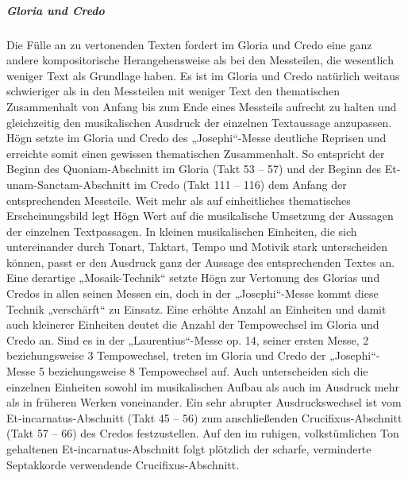 \documentclass[a4paper]{article}
\begin{document}
\subparagraph{Gloria und Credo}
Die Fülle an zu vertonenden Texten fordert im Gloria und Credo eine ganz
andere kompositorische Herangehensweise als bei den Messteilen, die
wesentlich weniger Text als Grundlage haben. Es ist im Gloria und Credo
natürlich weitaus schwieriger als in den Messteilen mit weniger Text
den thematischen Zusammenhalt von Anfang bis zum Ende eines Messteils
aufrecht zu halten und gleichzeitig den musikalischen Ausdruck der
einzelnen Textaussage anzupassen. Högn setzte im Gloria und Credo des
„Josephi“-Messe deutliche Reprisen und erreichte somit einen gewissen
thematischen Zusammenhalt. So entspricht der Beginn des
Quoniam-Abschnitt im Gloria (Takt 53 – 57) und der Beginn des
Et-unam-Sanctam-Abschnitt im Credo (Takt 111 – 116) dem Anfang der
entsprechenden Messteile. Weit mehr als auf einheitliches thematisches
Erscheinungsbild legt Högn Wert auf die musikalische Umsetzung der
Aussagen der einzelnen Textpassagen. In kleinen musikalischen
Einheiten, die sich untereinander durch Tonart, Taktart, Tempo und
Motivik stark unterscheiden können, passt er den Ausdruck ganz der
Aussage des entsprechenden Textes an. Eine derartige „Mosaik-Technik“
setzte Högn zur Vertonung des Glorias und Credos in allen seinen Messen
ein, doch in der „Josephi“-Messe kommt diese Technik „verschärft“ zu
Einsatz. Eine erhöhte Anzahl an Einheiten und damit auch kleinerer
Einheiten deutet die Anzahl der Tempowechsel im Gloria und Credo an.
Sind es in der „Laurentius“-Messe op. 14, seiner ersten Messe, 2
beziehungsweise 3 Tempowechsel, treten im Gloria und Credo der
„Josephi“-Messe 5 beziehungsweise 8 Tempowechsel auf. Auch
unterscheiden sich die einzelnen Einheiten sowohl im musikalischen
Aufbau als auch im Ausdruck mehr als in früheren Werken voneinander.
Ein sehr abrupter Ausdruckswechsel ist vom Et-incarnatus-Abschnitt
(Takt 45 – 56) zum anschließenden Crucifixus-Abschnitt (Takt 57 – 66)
des Credos festzustellen. Auf den im ruhigen, volkstümlichen Ton
gehaltenen Et-incarnatus-Abschnitt folgt plötzlich der scharfe,
verminderte Septakkorde verwendende Crucifixus-Abschnitt.
\end{document}
